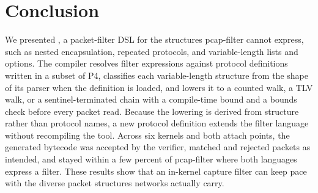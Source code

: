 \section{Conclusion}
\label{sec:conclusion}

We presented \kunai, a packet-filter DSL for the structures
pcap-filter cannot express, such as nested encapsulation, repeated
protocols, and variable-length lists and options. The compiler
resolves filter expressions against protocol definitions written in a
subset of P4, classifies each variable-length structure from the
shape of its parser when the definition is loaded, and lowers it to a
counted walk, a TLV walk, or a sentinel-terminated chain with a
compile-time bound and a bounds check before every packet read.
Because the lowering is derived from structure rather than protocol
names, a new protocol definition extends the filter language without
recompiling the tool. Across six kernels and both attach points, the
generated bytecode was accepted by the verifier, matched and rejected
packets as intended, and stayed within a few percent of pcap-filter
where both languages express a filter. These results show that an
in-kernel capture filter can keep pace with the diverse packet
structures networks actually carry.